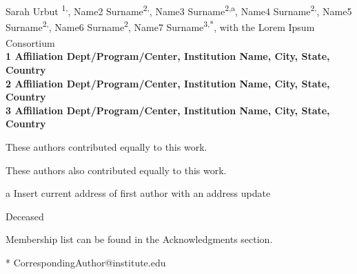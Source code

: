 \documentclass[10pt,letterpaper]{article}
\date{}
\begin{document}
\vspace*{0.35in}

\begin{flushleft}
{\Large
\textbf{}
}
\newline
\\
Sarah Urbut \textsuperscript{1,\Yinyang},
Name2 Surname\textsuperscript{2,\Yinyang},
Name3 Surname\textsuperscript{2,\textcurrency a},
Name4 Surname\textsuperscript{2,\ddag},
Name5 Surname\textsuperscript{2,\ddag},
Name6 Surname\textsuperscript{2},
Name7 Surname\textsuperscript{3,*},
with the Lorem Ipsum Consortium\textsuperscript{\textpilcrow}
\\
\bigskip
\bf{1} Affiliation Dept/Program/Center, Institution Name, City, State, Country
\\
\bf{2} Affiliation Dept/Program/Center, Institution Name, City, State, Country
\\
\bf{3} Affiliation Dept/Program/Center, Institution Name, City, State, Country
\\
\bigskip

% 
%
\Yinyang These authors contributed equally to this work.

\ddag These authors also contributed equally to this work.

\textcurrency a Insert current address of first author with an address update

\dag Deceased

\textpilcrow Membership list can be found in the Acknowledgments section.

* CorrespondingAuthor@institute.edu

\end{flushleft}
\end{document}
